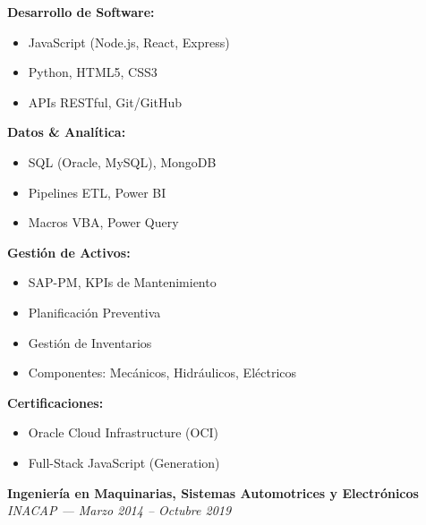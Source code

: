 \documentclass[10pt,letterpaper]{article}
\begin{document}
\noindent
\begin{minipage}[t]{0.48\textwidth}
\textbf{Desarrollo de Software:}
\begin{itemize}
    \item JavaScript (Node.js, React, Express)
    \item Python, HTML5, CSS3
    \item APIs RESTful, Git/GitHub
\end{itemize}

\vspace{0.2cm}

\textbf{Datos \& Analítica:}
\begin{itemize}
    \item SQL (Oracle, MySQL), MongoDB
    \item Pipelines ETL, Power BI
    \item Macros VBA, Power Query
\end{itemize}
\end{minipage}
\hfill
\begin{minipage}[t]{0.48\textwidth}
\textbf{Gestión de Activos:}
\begin{itemize}
    \item SAP-PM, KPIs de Mantenimiento
    \item Planificación Preventiva
    \item Gestión de Inventarios
    \item Componentes: Mecánicos, Hidráulicos, Eléctricos
\end{itemize}

\vspace{0.2cm}

\textbf{Certificaciones:}
\begin{itemize}
    \item Oracle Cloud Infrastructure (OCI)
    \item Full-Stack JavaScript (Generation)
\end{itemize}
\end{minipage}

\vspace{0.3cm}

\vspace{0.4cm}

\vspace{0.3cm}

\noindent \textbf{Ingeniería en Maquinarias, Sistemas Automotrices y Electrónicos} \\
\textit{INACAP — Marzo 2014 – Octubre 2019}
\end{document}
